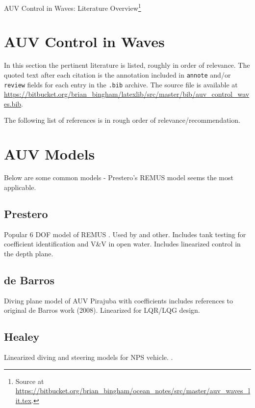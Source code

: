 \documentclass[11pt]{article}
\newcommand{\doctitle}{AUV Control in Waves: Literature Overview}
\begin{document}
\newpage
\setcounter{page}{1}
\begin{center}
{\huge \doctitle}\footnote{Source at \url{https://bitbucket.org/brian_bingham/ocean_notes/src/master/auv_waves_lit.tex}.}
\end{center}


\section{AUV Control in Waves}

\def  \Bibfname {auv_control_waves}

In this section the pertinent literature is listed, roughly in order of relevance.  The quoted text after each citation is the annotation included in \texttt{annote} and/or \texttt{review} fields for each entry in the \texttt{.bib} archive.  The source file is available at \url{https://bitbucket.org/brian_bingham/latexlib/src/master/bib/auv_control_waves.bib}.

The following list of references is in rough order of relevance/recommendation.



\bibliographyc{\Bibfname}


\section{AUV Models}

Below are some common models - Prestero's REMUS model seems the most applicable.

\subsection{Prestero}

Popular 6 DOF model of REMUS  . Used by  and other.  Includes tank testing for coefficient identification and V\&V in open water.  Includes linearized control in the depth plane.


\subsection{de Barros}

Diving plane model of AUV Pirajuba with coefficients  includes references to original de Barros work (2008).  Linearized for LQR/LQG design.

\subsection{Healey}

Linearized diving and steering models for NPS vehicle.
.


\newpage
\setcounter{page}{1}
\end{document}
